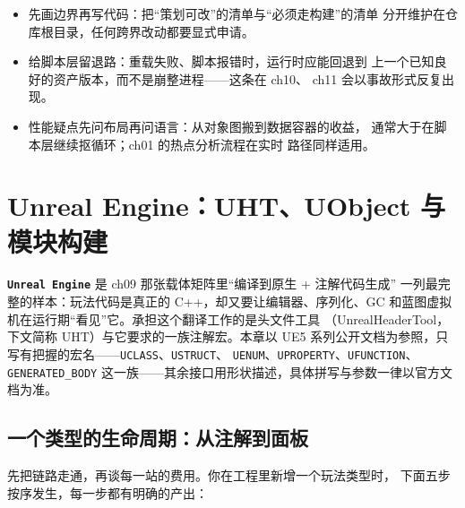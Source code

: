 \documentclass[12pt,a4paper,fontset=fandol]{ctexbook}
\newcommand{\Tp}[1]{\texttt{#1}}
\newcommand{\Lib}[1]{\textbf{\texttt{#1}}}
\newcommand{\Lang}[1]{\textsf{#1}}
\newcommand{\CPP}{\Lang{C++}}
\begin{document}
\begin{bestpractice}[title={给``两层化''项目的三条通用守则}]
\begin{itemize}
\item 先画边界再写代码：把``策划可改''的清单与``必须走构建''的清单
      分开维护在仓库根目录，任何跨界改动都要显式申请。
\item 给脚本层留退路：重载失败、脚本报错时，运行时应能回退到
      上一个已知良好的资产版本，而不是崩整进程——这条在 ch10、
      ch11 会以事故形式反复出现。
\item 性能疑点先问布局再问语言：从对象图搬到数据容器的收益，
      通常大于在脚本层继续抠循环；ch01 的热点分析流程在实时
      路径同样适用。
\end{itemize}
\end{bestpractice}

\chapter{Unreal Engine：UHT、UObject 与模块构建}
\label{ch:ch10-unreal}

\Lib{Unreal Engine} 是 ch09 那张载体矩阵里``编译到原生 + 注解代码生成''
一列最完整的样本：玩法代码是真正的 \CPP{}，却又要让编辑器、序列化、GC
和蓝图虚拟机在运行期``看见''它。承担这个翻译工作的是头文件工具
（UnrealHeaderTool，下文简称 UHT）与它要求的一族注解宏。本章以 UE5
系列公开文档为参照，只写有把握的宏名——\Tp{UCLASS}、\Tp{USTRUCT}、
\Tp{UENUM}、\Tp{UPROPERTY}、\Tp{UFUNCTION}、\Tp{GENERATED\_BODY}
这一族——其余接口用形状描述，具体拼写与参数一律以官方文档为准。

\section{一个类型的生命周期：从注解到面板}
\label{sec:ch10-type-lifecycle}

先把链路走通，再谈每一站的费用。你在工程里新增一个玩法类型时，
下面五步按序发生，每一步都有明确的产出：
\end{document}

